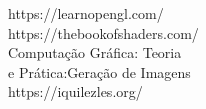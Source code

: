 \documentclass[preview]{standalone}
\begin{document}
https://learnopengl.com/\\https://thebookofshaders.com/\\Computação Gráfica: Teoria\\e Prática:Geração de Imagens\\https://iquilezles.org/\\
\end{document}
